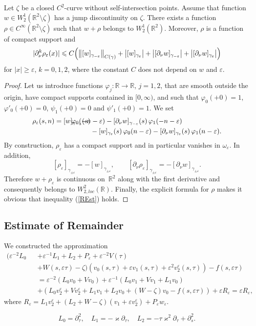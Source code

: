 \documentclass[graybox]{svmult}
\renewcommand{\kappa}{\varkappa}
\newcommand{\Real}{\mathbb R}
\newcommand{\eps}{\varepsilon}
\renewcommand{\phi}{\varphi}
\renewcommand{\leq}{\leqslant}
\renewcommand{\geq}{\geqslant}
\newcommand{\eqref}[1]{(\ref{#1})}
\begin{document}
\begin{proposition}\label{PropW22Corrector}
Let $\zeta$ be a  closed $C^2$-curve without self-intersection
points.
Assume that function $w\in W_2^1(\Real^2\setminus\zeta)$ has  a jump discontinuity on $\zeta$. There exists a function $\rho\in C^\infty(\Real^2\setminus\zeta)$ such that   $w+\rho$ belongs to $W_2^1(\Real^2)$. Moreover, $\rho$ is a function of compact support and
    \begin{equation}\label{REst}
        |\partial_\nu^{k}\rho_\eps(x)|\leq
 C \Bigl(\bigl\|[w]_{\gamma_{-\eps}}\bigr\|_{C(\gamma)}
    +\bigl|[w]_{\gamma_{\eps}}\bigr|
        +\bigl|[\partial_\nu w]_{\gamma_{-\eps}}\bigr|
        +\bigl|[\partial_\nu w]_{\gamma_{\eps}}\bigr|\Bigr)
    \end{equation}
for $|x|\geq \eps$,  $k=0,1,2$, where the constant $C$ does not depend on $w$ and $\eps$.
\end{proposition}

\begin{proof}
Let us introduce functions $\phi_j\colon \Real\to\Real$, $j=1,2$, that are smooth outside the origin, have compact supports contained in $[0,\infty)$, and such that $\phi_0(+0)=1$, $\phi'_0(+0)=0$, $\psi_1(+0)=0$ and $\psi'_1(+0)=1$.
We set
\begin{eqnarray}\nonumber
\rho_\eps(s,n)=[w]_{\gamma_{-\eps}}(s)&\kern-28pt\phi_0(-n-\eps)
-[\partial_\nu w]_{\gamma_{-\eps}}(s)\,\phi_1(-n-\eps)\\
&-[w]_{\gamma_{\eps}}(s)\,\phi_0(n-\eps)-[\partial_\nu w]_{\gamma_{\eps}}(s)\,\phi_1(n-\eps).
\end{eqnarray}
By construction,  $\rho_\eps$ has a compact support and in particular vanishes in $\omega_\eps$. In addition,
$$
[\rho_\eps]_{\gamma_{\pm\eps}}=-[w]_{\gamma_{\pm\eps}}, \qquad
[\partial_\nu \rho_\eps]_{\gamma_{\pm\eps}}=-[\partial_\nu w]_{\gamma_{\pm\eps}}.
$$
Therefore $w+\rho_\eps$ is continuous on~$\Real^2$ along with the first derivative and consequently belongs to $W_{2, loc}^2(\Real)$.
Finally, the explicit formula for $\rho$  makes it obvious that inequality \eqref{REst} holds.
\end{proof}




\subsection{Estimate of Remainder}
We constructed the approximation
\begin{eqnarray}\nonumber
  (\eps^{-2}L_0&&+\eps^{-1}L_1+L_2+P_\eps+\eps^{-2}V(\tau)\\\nonumber
&&+W(s,\eps\tau)-\zeta )(v_0(s,\tau)+\eps v_1(s,\tau)+\eps^2 v_2^\eps(s,\tau))-f(s,\eps\tau)\\\nonumber
&&=\eps^{-2}(L_0v_0+Vv_0)+\eps^{-1}(L_0v_1+Vv_1+L_1v_0)\\\nonumber
&&+(L_0v_2^\eps+Vv_2^\eps+L_1v_1+L_2v_0+(W-\zeta)v_0-f(s,\eps\tau))+\eps R_\eps=\eps R_\eps,
\end{eqnarray}
where $R_\eps=L_1v_2^\eps+(L_2+W-\zeta)(v_1+\eps v_2^\eps)+P_\eps w_\eps$.

$$
L_0=\partial^2_\tau, \quad  L_1=-\kappa\partial_\tau, \quad
L_2=-\tau \kappa^2\partial_\tau+\partial^2_s.
$$







\newpage

\end{document}
